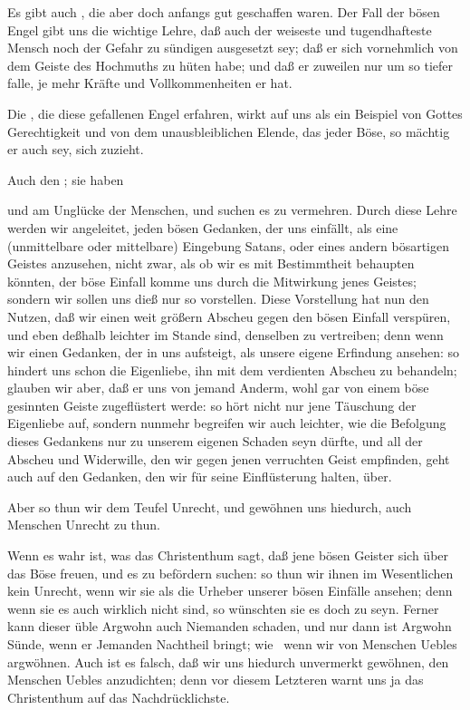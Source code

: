 \begin{aufza}
\item 
\begin{aufzb} 
\item Es gibt auch , die aber doch anfangs gut geschaffen waren. Der Fall der bösen Engel gibt uns die wichtige Lehre, daß auch der weiseste und tugendhafteste Mensch noch der Gefahr zu sündigen ausgesetzt sey; daß er sich vornehmlich von dem Geiste des Hochmuths zu hüten habe; und daß er zuweilen nur um so tiefer falle, je mehr Kräfte und Vollkommenheiten er hat.
\item Die , die diese gefallenen Engel erfahren, wirkt auf uns als ein Beispiel von Gottes Gerechtigkeit und von dem unausbleiblichen Elende, das jeder Böse, so mächtig er auch sey, sich zuzieht.
\end{aufzb}
\item Auch den ; sie haben
\begin{aufzb}
\item {} und am Unglücke der Menschen, und suchen es zu vermehren. Durch diese Lehre werden wir angeleitet, jeden bösen Gedanken, der uns einfällt, als eine (unmittelbare oder mittelbare) Eingebung Satans, oder eines andern bösartigen Geistes anzusehen, nicht zwar, als ob wir es mit Bestimmtheit behaupten könnten, der böse Einfall komme uns durch die Mitwirkung jenes Geistes; sondern wir sollen uns dieß nur so vorstellen. Diese Vorstellung hat nun den Nutzen, daß wir einen weit größern Abscheu gegen den bösen Einfall verspüren, und eben deßhalb leichter im Stande sind, denselben zu vertreiben; denn wenn wir einen Gedanken, der in uns aufsteigt, als unsere eigene Erfindung ansehen: so hindert uns schon die Eigenliebe, ihn mit dem verdienten Abscheu zu behandeln; glauben wir aber, daß er uns von jemand Anderm, wohl gar von einem böse gesinnten Geiste zugeflüstert werde: so hört nicht nur jene Täuschung der Eigenliebe auf, sondern nunmehr begreifen wir auch leichter, wie die Befolgung dieses Gedankens nur zu unserem eigenen Schaden seyn dürfte, und all der Abscheu und Widerwille, den wir gegen jenen verruchten Geist empfinden, geht auch auf den Gedanken, den wir für seine Einflüsterung halten, über.\par
{} Aber so thun wir dem Teufel Unrecht, und gewöhnen uns hiedurch, auch Menschen Unrecht zu thun.~\par
{} Wenn es wahr ist, was das Christenthum sagt, daß jene bösen Geister sich über das Böse freuen, und es zu befördern suchen: so thun wir ihnen im Wesentlichen kein Unrecht, wenn wir sie als die Urheber unserer bösen Einfälle ansehen; denn wenn sie es auch wirklich nicht sind, so wünschten sie es doch zu seyn. Ferner kann dieser üble Argwohn auch Niemanden schaden, und nur dann ist Argwohn Sünde, wenn er Jemanden Nachtheil bringt; wie \zB\ wenn wir von Menschen Uebles argwöhnen. Auch ist es falsch, daß wir uns hiedurch unvermerkt gewöhnen, den Menschen Uebles anzudichten; denn vor diesem Letzteren warnt uns ja das Christenthum auf das Nachdrücklichste.\par

\end{aufzb}
\end{aufza}
